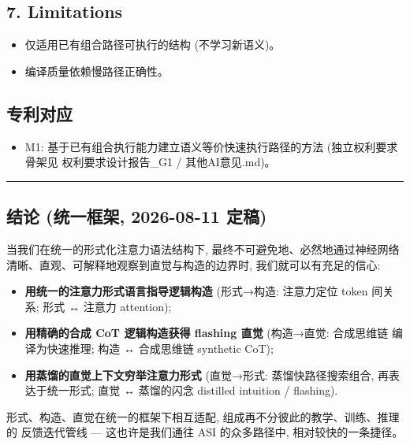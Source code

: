 \documentclass[
]{article}
\providecommand{\tightlist}{%
  \setlength{\itemsep}{0pt}\setlength{\parskip}{0pt}}
\begin{document}
\subsection{7. Limitations}\label{limitations}

\begin{itemize}
\tightlist
\item
  仅适用已有组合路径可执行的结构 (不学习新语义)。
\item
  编译质量依赖慢路径正确性。
\end{itemize}

\subsection{专利对应}\label{ux4e13ux5229ux5bf9ux5e94}

\begin{itemize}
\tightlist
\item
  M1: 基于已有组合执行能力建立语义等价快速执行路径的方法
  (独立权利要求骨架见 权利要求设计报告\_G1 / 其他AI意见.md)。
\end{itemize}

\begin{center}\rule{0.5\linewidth}{0.5pt}\end{center}

\subsection{结论 (统一框架, 2026-08-11
定稿)}\label{ux7ed3ux8bba-ux7edfux4e00ux6846ux67b6-2026-08-11-ux5b9aux7a3f}

当我们在统一的形式化注意力语法结构下, 最终不可避免地、必然地通过神经网络
清晰、直观、可解释地观察到直觉与构造的边界时, 我们就可以有充足的信心:

\begin{itemize}
\tightlist
\item
  \textbf{用统一的注意力形式语言指导逻辑构造} (形式→构造: 注意力定位
  token 间关系; 形式 ↔ 注意力 attention);
\item
  \textbf{用精确的合成 CoT 逻辑构造获得 flashing 直觉} (构造→直觉:
  合成思维链 编译为快速推理; 构造 ↔ 合成思维链 synthetic CoT);
\item
  \textbf{用蒸馏的直觉上下文穷举注意力形式} (直觉→形式:
  蒸馏快路径搜索组合, 再表达于统一形式; 直觉 ↔ 蒸馏的闪念 distilled
  intuition / flashing).
\end{itemize}

形式、构造、直觉在统一的框架下相互适配,
组成再不分彼此的教学、训练、推理的 反馈迭代管线 --- 这也许是我们通往 ASI
的众多路径中, 相对较快的一条捷径。
\end{document}
